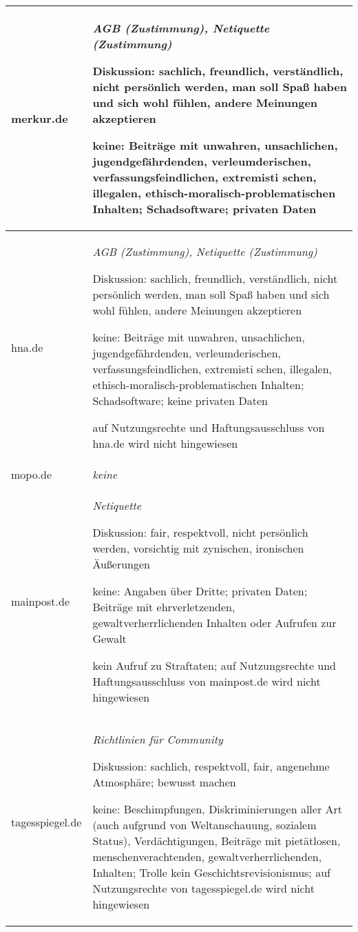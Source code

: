 \begin{landscape}
\begin{longtable}{lp{170mm}}
merkur.de & \emph{AGB (Zustimmung), Netiquette (Zustimmung)}

	Diskussion: sachlich, freundlich, verständlich, nicht persönlich werden, man soll Spaß haben und
	sich wohl fühlen, andere Meinungen akzeptieren
	
	keine: Beiträge mit un\-wah\-ren, un\-sach\-lichen, ju\-gend\-ge\-fähr\-den\-den, ver\-leum\-de\-ri\-schen, ver\-fas\-sungs\-feind\-li\-chen, ex\-tre\-mis\-ti\-			schen, il\-le\-ga\-len, ethisch-mo\-ra\-lisch-pro\-ble\-ma\-ti\-schen Inhalten; 
	Schadsoftware; 
	privaten Daten\tabularnewline\midrule

hna.de & \emph{AGB (Zustimmung), Netiquette (Zustimmung)}

	Diskussion: sachlich, freundlich, verständlich, nicht persönlich werden, man soll Spaß haben und
	sich wohl fühlen, andere Meinungen akzeptieren
	
	keine: Beiträge mit un\-wah\-ren, un\-sach\-lichen, ju\-gend\-ge\-fähr\-den\-den, ver\-leum\-de\-ri\-schen, ver\-fas\-sungs\-feind\-li\-chen, ex\-tre\-mis\-ti\-			schen, il\-le\-ga\-len, ethisch-mo\-ra\-lisch-pro\-ble\-ma\-ti\-schen Inhalten; 
	Schadsoftware; 
	keine privaten Daten
	
	auf Nutzungsrechte und Haftungsausschluss von hna.de wird nicht hingewiesen\tabularnewline\midrule

mopo.de &  \emph{keine}\tabularnewline\midrule

mainpost.de& \emph{Netiquette}

	Diskussion: fair, respektvoll, nicht persönlich werden, vorsichtig mit zynischen, ironischen Äußerungen
	
	keine: Angaben über Dritte; privaten Daten; Beiträge mit ehrverletzenden, gewaltverherrlichenden Inhalten oder Aufrufen zur Gewalt
	
	kein Aufruf zu Straftaten; auf Nutzungsrechte und Haftungsausschluss von mainpost.de wird nicht hingewiesen
	\tabularnewline\midrule

tagesspiegel.de & \emph{Richtlinien für Community}

	Diskussion: sachlich, respektvoll, fair, angenehme Atmosphäre;
	bewusst machen
	
	keine: Beschimpfungen, Diskriminierungen aller Art (auch aufgrund von
	Weltanschauung, sozialem Status), Verdächtigungen, 
	Beiträge mit pietätlosen, menschenverachtenden, gewaltverherrlichenden, Inhalten; 
	Trolle
	kein Geschichtsrevisionismus; auf Nutzungsrechte von tagesspiegel.de wird nicht hingewiesen\tabularnewline\midrule


\end{longtable}
\end{landscape}
